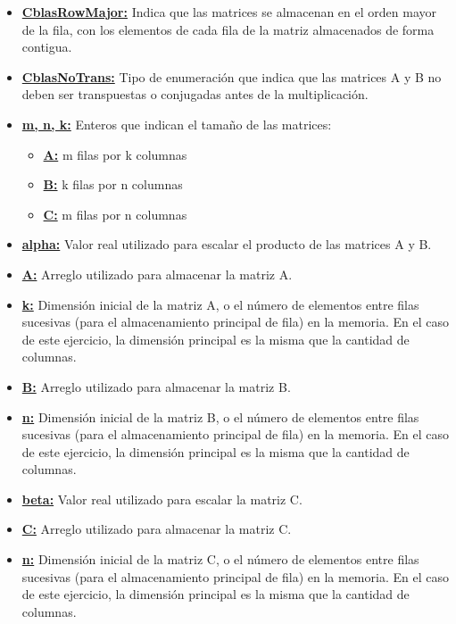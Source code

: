     \begin{itemize}
        \item \underline{\textbf{CblasRowMajor:}} Indica que las matrices se
        almacenan en el orden mayor de la fila, con los elementos de cada fila
        de la matriz almacenados de forma contigua.
        \item \underline{\textbf{CblasNoTrans:}} Tipo de enumeración que indica
        que las matrices A y B no deben ser transpuestas o conjugadas antes de
        la multiplicación.
        \item \underline{\textbf{m, n, k:}} Enteros que indican el tamaño de
        las matrices:
        \begin{itemize}
            \item \underline{\textbf{A:}} m filas por k columnas
            \item \underline{\textbf{B:}} k filas por n columnas
            \item \underline{\textbf{C:}} m filas por n columnas
        \end{itemize}
        \item \underline{\textbf{alpha:}} Valor real utilizado para escalar el
        producto de las matrices A y B.
        \item \underline{\textbf{A:}} Arreglo utilizado para almacenar la matriz A.
        \item \underline{\textbf{k:}} Dimensión inicial de la matriz A, o el
        número de elementos entre filas sucesivas (para el almacenamiento
        principal de fila) en la memoria. En el caso de este ejercicio,
        la dimensión principal es la misma que la cantidad de columnas.
        \item \underline{\textbf{B:}} Arreglo utilizado para almacenar la matriz B.
        \item \underline{\textbf{n:}} Dimensión inicial de la matriz B, o el
        número de elementos entre filas sucesivas (para el almacenamiento
        principal de fila) en la memoria. En el caso de este ejercicio, la
        dimensión principal es la misma que la cantidad de columnas.
        \item \underline{\textbf{beta:}} Valor real utilizado para escalar la matriz C.
        \item \underline{\textbf{C:}} Arreglo utilizado para almacenar la matriz C.
        \item \underline{\textbf{n:}} Dimensión inicial de la matriz C, o el
        número de elementos entre filas sucesivas (para el almacenamiento
        principal de fila) en la memoria. En el caso de este ejercicio, la
        dimensión principal es la misma que la cantidad de columnas.
    \end{itemize}



